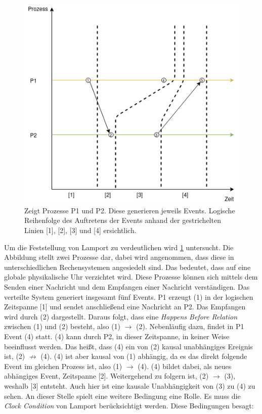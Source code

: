 \begin{figure}[!ht]
	\centering
	\includegraphics[scale=0.5]{img/Themenueberblick/PartialOrdering_ChildO.png}
	\caption[Partielle Ordnung von nebenläufigen Events]{Zeigt Prozesse P1 und P2. Diese generieren jeweils Events. Logische Reihenfolge des Auftretens der Events anhand der gestrichelten Linien [1], [2], [3] und [4] ersichtlich.}
	\label{fig:Partial_Ordering_Concurrent}
\end{figure}

Um die Feststellung von Lamport zu verdeutlichen wird \cref{fig:Partial_Ordering_Concurrent} untersucht. Die Abbildung stellt zwei Prozesse dar, dabei wird angenommen, dass diese in unterschiedlichen Rechensystemen angesiedelt sind. Das bedeutet, dass auf eine globale physikalische Uhr verzichtet wird. Diese Prozesse können sich mittels dem Senden einer Nachricht und dem Empfangen einer Nachricht verständigen. Das verteilte System generiert insgesamt fünf Events. P1 erzeugt (1) in der logischen Zeitspanne [1] und sendet anschließend eine Nachricht an P2. Das Empfangen wird durch (2) dargestellt. Daraus folgt, dass eine \emph{Happens Before Relation} zwischen (1) und (2) besteht, also (1) $\rightarrow$ (2). Nebenläufig dazu, findet in P1 Event (4) statt. (4) kann durch P2, in dieser Zeitspanne, in keiner Weise beeinflusst werden. Das heißt, dass (4) ein von (2)  kausal unabhängiges Ereignis ist, (2) $\not\rightarrow$ (4). (4) ist aber kausal von (1) abhängig, da es das direkt folgende Event im gleichen Prozess ist, also (1) $\rightarrow$ (4). (4) bildet dabei, als neues abhängiges Event, Zeitspanne [2]. Weitergehend zu folgern ist, (2) $\rightarrow$ (3), weshalb [3] entsteht. Auch hier ist eine kausale Unabhängigkeit von (3) zu (4) zu sehen. An dieser Stelle spielt eine weitere Bedingung eine Rolle. Es muss die \emph{Clock Condition} von Lamport berücksichtigt werden. Diese Bedingungen besagt:

